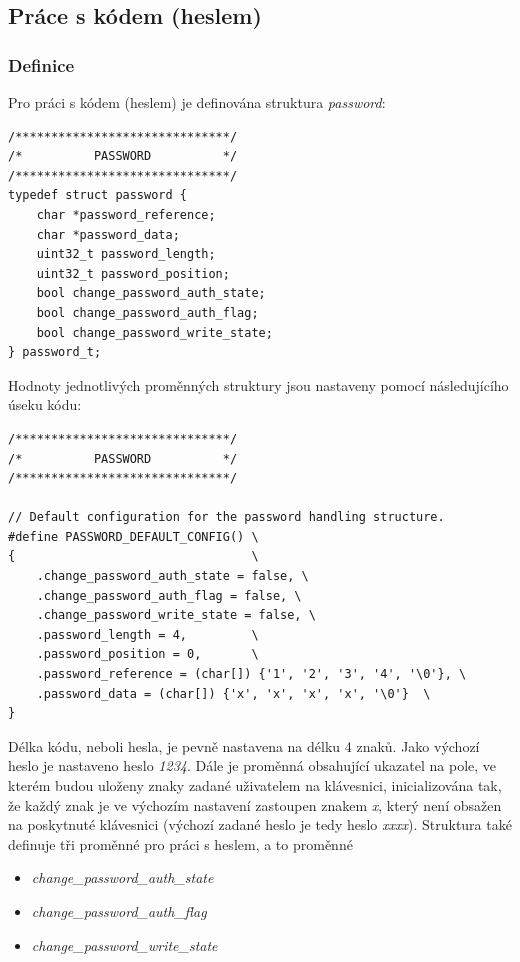 \documentclass[a4paper, 12pt]{article}
\begin{document}
\subsection{Práce s kódem (heslem)}

\subsubsection*{Definice}

Pro práci s kódem (heslem) je definována struktura \textit{password}:

\begin{lstlisting}[style=CLanguage]
/******************************/
/*          PASSWORD          */
/******************************/
typedef struct password {
    char *password_reference;
    char *password_data;
    uint32_t password_length;
    uint32_t password_position;
    bool change_password_auth_state;
    bool change_password_auth_flag;
    bool change_password_write_state;
} password_t;
\end{lstlisting}

Hodnoty jednotlivých proměnných struktury jsou nastaveny pomocí následujícího úseku kódu:

\begin{lstlisting}[style=CLanguage]
/******************************/
/*          PASSWORD          */
/******************************/

// Default configuration for the password handling structure.
#define PASSWORD_DEFAULT_CONFIG() \
{                                 \
    .change_password_auth_state = false, \
    .change_password_auth_flag = false, \
    .change_password_write_state = false, \
    .password_length = 4,         \
    .password_position = 0,       \
    .password_reference = (char[]) {'1', '2', '3', '4', '\0'}, \
    .password_data = (char[]) {'x', 'x', 'x', 'x', '\0'}  \
}
\end{lstlisting}

Délka kódu, neboli hesla, je pevně nastavena na délku 4 znaků. Jako výchozí heslo je nastaveno heslo \textit{1234}. Dále je proměnná obsahující ukazatel na pole, ve kterém budou uloženy znaky zadané uživatelem na klávesnici, inicializována tak, že každý znak je ve výchozím nastavení zastoupen znakem \textit{x}, který není obsažen na poskytnuté klávesnici (výchozí zadané heslo je tedy heslo \textit{xxxx}). Struktura také definuje tři proměnné pro práci s heslem, a to proměnné

\begin{itemize}
    \item \textit{change\_password\_auth\_state}
    \item \textit{change\_password\_auth\_flag}
    \item \textit{change\_password\_write\_state}
\end{itemize}
\end{document}
